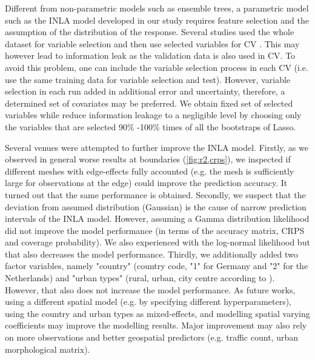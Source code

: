 \documentclass{article}
\begin{document}
Different from non-parametric models such as ensemble trees, a parametric model such as the INLA model developed in our study requires feature selection and the assumption of the distribution of the response. Several studies used the whole dataset for variable selection and then use selected variables for CV \citep{lu2020land,larkin2017global}. This may however lead to information leak as the validation data is also used in CV. To avoid this problem, one can include the variable selection process in each CV (i.e. use the same training data for variable selection and test). However, variable selection in each run added in additional error and uncertainty, therefore, a determined set of covariates may be preferred. We obtain fixed set of selected variables while reduce information leakage to a negligible level by choosing only the variables that are selected 90\% -100\% times of all the bootstraps of Lasso.


Several venues were attempted to further improve the INLA model. Firstly, as we observed in general worse results at boundaries (\cref{fig:r2,crps}), we inspected if different meshes with edge-effects fully accounted (e.g. the mesh is sufficiently large for observations at the edge) could improve the prediction accuracy. It turned out that the same performance is obtained. Secondly, we suspect that the deviation from assumed distribution (Gaussian) is the cause of narrow prediction intervals of the INLA model. However, assuming a Gamma distribution likelihood did not improve the model performance (in terms of the accuracy matrix, CRPS and coverage probability). We also experienced with the log-normal likelihood but that also decreases the model performance. Thirdly, we additionally added two factor variables, namely "country" (country code, "1" for Germany and "2" for the Netherlands) and "urban types" (rural, urban, city centre according to \citep{urbantype}). However, that also does not increase the model performance. As future works, using a different spatial model (e.g. by specifying different hyperparameters), using the country and urban types as mixed-effects, and modelling spatial varying coefficients may improve the modelling results. Major improvement may also rely on more observations and better geospatial predictors (e.g. traffic count, urban morphological matrix). 

\end{document}
